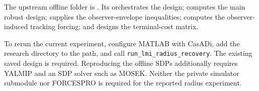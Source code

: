 \documentclass[11pt,a4paper]{article}
\numberwithin{equation}{section}
\theoremstyle{remark}\newtheorem{remark}{Remark}
\begin{document}
The upstream offline folder is
.
Its  orchestrates the design;
 computes the main robust design;
 supplies the observer-envelope inequalities;
 computes the observer-induced tracking forcing; and
 designs the terminal-cost matrix.

To rerun the current experiment, configure MATLAB with CasADi, add the research directory to the path, and call \texttt{run\_lmi\_radius\_recovery}. The existing saved design is required. Reproducing the offline SDPs additionally requires YALMIP and an SDP solver such as MOSEK. Neither the private simulator submodule nor FORCESPRO is required for the reported radius experiment.


\fi
\end{document}
